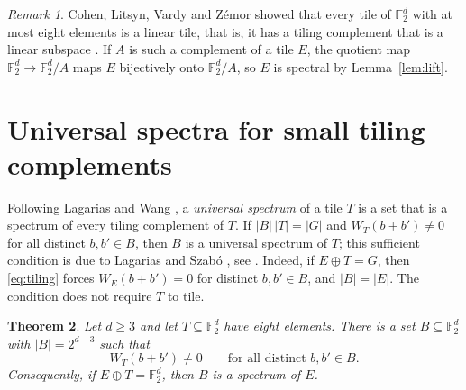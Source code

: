 \documentclass[11pt]{amsart}
\newtheorem{theorem}{Theorem}[section]
\theoremstyle{definition}
\theoremstyle{remark}
\newtheorem{remark}[theorem]{Remark}
\numberwithin{equation}{section}
\numberwithin{table}{section}
\newcommand{\F}{\mathbb{F}}
\begin{document}
\begin{remark}\label{rem:clvz}
Cohen, Litsyn, Vardy and Z\'emor showed that every tile of $\F_2^d$ with at most eight elements is a linear tile, that is, it has a tiling complement that is a linear subspace \cite[end of Section~4; Corollary~7.3 and Proposition~6.1]{CLVZ96}. If $A$ is such a complement of a tile $E$, the quotient map $\F_2^d\to\F_2^d/A$ maps $E$ bijectively onto $\F_2^d/A$, so $E$ is spectral by Lemma~\ref{lem:lift}.
\end{remark}

\section{Universal spectra for small tiling complements}\label{sec:tiles}

Following Lagarias and Wang \cite{LW97}, a \emph{universal spectrum} of a tile $T$ is a set that is a spectrum of every tiling complement of $T$. If $|B|\,|T|=|G|$ and $W_T(b+b')\ne0$ for all distinct $b,b'\in B$, then $B$ is a universal spectrum of $T$; this sufficient condition is due to Lagarias and Szab\'o \cite{LS01}, see \cite[Proposition~4]{FMM06}. Indeed, if $E\oplus T=G$, then \eqref{eq:tiling} forces $W_E(b+b')=0$ for distinct $b,b'\in B$, and $|B|=|E|$. The condition does not require $T$ to tile.

\begin{theorem}\label{thm:universal}
Let $d\ge3$ and let $T\subseteq\F_2^d$ have eight elements. There is a set $B\subseteq\F_2^d$ with $|B|=2^{d-3}$ such that
\begin{equation}\label{eq:nonzero}
W_T(b+b')\ne0\qquad\text{for all distinct } b,b'\in B .
\end{equation}
Consequently, if $E\oplus T=\F_2^d$, then $B$ is a spectrum of $E$.
\end{theorem}
\end{document}
